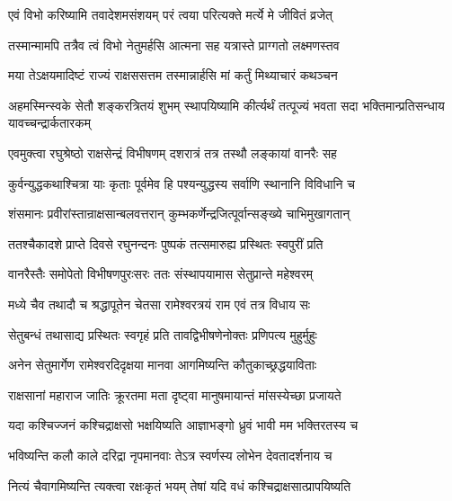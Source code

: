 
\twolineshloka
{एवं विभो करिष्यामि तवादेशमसंशयम्}
{परं त्वया परित्यक्ते मर्त्ये मे जीवितं व्रजेत्}%

\twolineshloka
{तस्मान्मामपि तत्रैव त्वं विभो नेतुमर्हसि}
{आत्मना सह यत्रास्ते प्राग्गतो लक्ष्मणस्तव}%


\twolineshloka
{मया तेऽक्षयमादिष्टं राज्यं राक्षससत्तम}
{तस्मान्नार्हसि मां कर्तुं मिथ्याचारं कथञ्चन}%

\threelineshloka
{अहमस्मिन्स्वके सेतौ शङ्करत्रितयं शुभम्}
{स्थापयिष्यामि कीर्त्यर्थं तत्पूज्यं भवता सदा}
{भक्तिमान्प्रतिसन्धाय यावच्चन्द्रार्कतारकम्}%

\twolineshloka
{एवमुक्त्वा रघुश्रेष्ठो राक्षसेन्द्रं विभीषणम्}
{दशरात्रं तत्र तस्थौ लङ्कायां वानरैः सह}%

\twolineshloka
{कुर्वन्युद्धकथाश्चित्रा याः कृताः पूर्वमेव हि}
{पश्यन्युद्धस्य सर्वाणि स्थानानि विविधानि च}%

\twolineshloka
{शंसमानः प्रवीरांस्तान्राक्षसान्बलवत्तरान्}
{कुम्भकर्णेन्द्रजित्पूर्वान्सङ्ख्ये चाभिमुखागतान्}%

\twolineshloka
{ततश्चैकादशे प्राप्ते दिवसे रघुनन्दनः}
{पुष्पकं तत्समारुह्य प्रस्थितः स्वपुरीं प्रति}%

\twolineshloka
{वानरैस्तैः समोपेतो विभीषणपुरःसरः}
{ततः संस्थापयामास सेतुप्रान्ते महेश्वरम्}%

\twolineshloka
{मध्ये चैव तथादौ च श्रद्धापूतेन चेतसा}
{रामेश्वरत्रयं राम एवं तत्र विधाय सः}%

\twolineshloka
{सेतुबन्धं तथासाद्य प्रस्थितः स्वगृहं प्रति}
{तावद्विभीषणेनोक्तः प्रणिपत्य मुहुर्मुहुः}%


\twolineshloka
{अनेन सेतुमार्गेण रामेश्वरदिदृक्षया}
{मानवा आगमिष्यन्ति कौतुकाच्छ्रद्धयाविताः}%

\twolineshloka
{राक्षसानां महाराज जातिः क्रूरतमा मता}
{दृष्ट्वा मानुषमायान्तं मांसस्येच्छा प्रजायते}%

\twolineshloka
{यदा कश्चिज्जनं कश्चिद्राक्षसो भक्षयिष्यति}
{आज्ञाभङ्गो ध्रुवं भावी मम भक्तिरतस्य च}%

\twolineshloka
{भविष्यन्ति कलौ काले दरिद्रा नृपमानवाः}
{तेऽत्र स्वर्णस्य लोभेन देवतादर्शनाय च}%

\twolineshloka
{नित्यं चैवागमिष्यन्ति त्यक्त्वा रक्षःकृतं भयम्}
{तेषां यदि वधं कश्चिद्राक्षसात्प्रापयिष्यति}%

